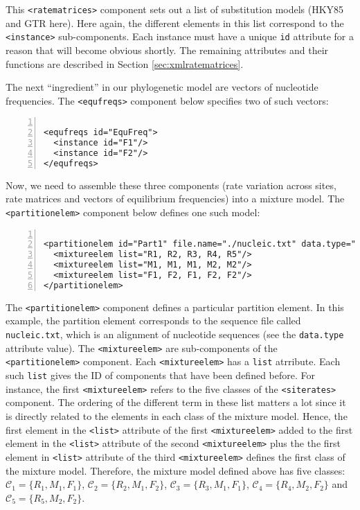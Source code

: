 \documentclass[a4paper,12pt]{article}
\newcommand{\x}[1]{\texttt{#1}}
\begin{document}
This \x{<ratematrices>} component sets out a list  of substitution models (HKY85 and GTR here). Here
again, the  different elements in  this list correspond  to the \x{<instance>}  sub-components. Each
instance must  have a unique \x{id}  attribute for a reason  that will become obvious  shortly.  The
remaining attributes and their functions are described in Section \ref{sec:xmlratematrices}.

The next ``ingredient'' in our phylogenetic model are vectors of nucleotide frequencies. The
\x{<equfreqs>} component below specifies two of such vectors:


\vspace{0.2cm}
\begin{Verbatim}[frame=single, label=Equilibrium frequencies, samepage=true, baselinestretch=0.5,
  fontsize=\small, numbers=left]

<equfreqs id="EquFreq">
  <instance id="F1"/>
  <instance id="F2"/>
</equfreqs>

\end{Verbatim}

Now, we need to assemble these three components (rate variation across sites, rate matrices and
vectors of equilibrium frequencies) into a mixture model. The \x{<partitionelem>} component below
defines one such model:

\vspace{0.2cm}
\begin{Verbatim}[frame=single, label=Mixture model, samepage=true, baselinestretch=0.5,
  fontsize=\small, numbers=left]

<partitionelem id="Part1" file.name="./nucleic.txt" data.type="nt">
  <mixtureelem list="R1, R2, R3, R4, R5"/>
  <mixtureelem list="M1, M1, M1, M2, M2"/>
  <mixtureelem list="F1, F2, F1, F2, F2"/>
</partitionelem>

\end{Verbatim}

The  \x{<partitionelem>} component  defines a  particular partition  element. In  this example,  the
partition element corresponds to the sequence file  called \x{nucleic.txt}, which is an alignment of
nucleotide  sequences   (see  the   \x{data.type}  attribute   value).   The   \x{<mixtureelem>}  are
sub-components  of  the  \x{<partitionelem>}  component.   Each  \x{<mixtureelem>}  has  a  \x{list}
atrribute.   Each such  \x{list} gives  the ID  of components  that have  been defined  before.  For
instance,  the  first   \x{<mixtureelem>}  refers  to  the  five  classes   of  the  \x{<siterates>}
component. The  ordering of  the different term  in these list  matters a  lot since it  is directly
related  to the  elements in  each class  of  the mixture  model. Hence,  the first  element in  the
\x{<list>} attribute  of the first  \x{<mixtureelem>} added to the  first element in  the \x{<list>}
attribute of the second \x{<mixtureelem>} plus the  the first element in \x{<list>} attribute of the
third \x{<mixtureelem>} defines the  first class of the mixture model.  Therefore, the mixture model
defined   above   has   five   classes:  $\mathcal{C}_1   =   \{R_1,M_1,F_1\}$,   $\mathcal{C}_2   =
\{R_2,M_1,F_2\}$,  $\mathcal{C}_3   =  \{R_3,M_1,F_1\}$,   $\mathcal{C}_4  =   \{R_4,M_2,F_2\}$  and
$\mathcal{C}_5 = \{R_5,M_2,F_2\}$.
\end{document}
